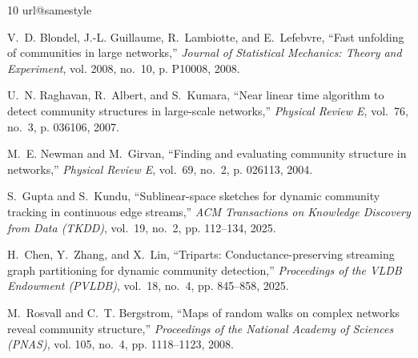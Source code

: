 \documentclass[10pt,journal,compsoc]{IEEEtran}
\begin{document}

\begin{thebibliography}{10}
\providecommand{\url}[1]{#1}
\csname url@samestyle\endcsname
\providecommand{\newblock}{\relax}
\providecommand{\bibinfo}[2]{#2}
\providecommand{\BIBentrySTDinterwordspacing}{\spaceskip=0pt\relax}
\providecommand{\BIBentryALTinterwordstretchfactor}{4}
\providecommand{\BIBentryALTinterwordspacing}{\spaceskip=\fontdimen2\font plus
\BIBentryALTinterwordstretchfactor\fontdimen3\font minus
  \fontdimen4\font\relax}
\providecommand{\BIBforeignlanguage}[2]{{%
\expandafter\ifx\csname l@#1\endcsname\relax
\typeout{** WARNING: IEEEtran.bst: No hyphenation pattern has been}%
\typeout{** loaded for the language `#1'. Using the pattern for}%
\typeout{** the default language instead.}%
\else
\language=\csname l@#1\endcsname
\fi
#2}}
\providecommand{\BIBdecl}{\relax}
\BIBdecl

V.~D. Blondel, J.-L. Guillaume, R.~Lambiotte, and E.~Lefebvre, ``Fast unfolding of communities in large networks,'' \emph{Journal of Statistical Mechanics: Theory and Experiment}, vol. 2008, no.~10, p. P10008, 2008.

U.~N. Raghavan, R.~Albert, and S.~Kumara, ``Near linear time algorithm to detect community structures in large-scale networks,'' \emph{Physical Review E}, vol.~76, no.~3, p. 036106, 2007.

M.~E. Newman and M.~Girvan, ``Finding and evaluating community structure in networks,'' \emph{Physical Review E}, vol.~69, no.~2, p. 026113, 2004.

S.~Gupta and S.~Kundu, ``Sublinear-space sketches for dynamic community tracking in continuous edge streams,'' \emph{ACM Transactions on Knowledge Discovery from Data (TKDD)}, vol.~19, no.~2, pp. 112--134, 2025.

H.~Chen, Y.~Zhang, and X.~Lin, ``Triparts: Conductance-preserving streaming graph partitioning for dynamic community detection,'' \emph{Proceedings of the VLDB Endowment (PVLDB)}, vol.~18, no.~4, pp. 845--858, 2025.

M.~Rosvall and C.~T. Bergstrom, ``Maps of random walks on complex networks reveal community structure,'' \emph{Proceedings of the National Academy of Sciences (PNAS)}, vol. 105, no.~4, pp. 1118--1123, 2008.


\end{thebibliography}
\end{document}
